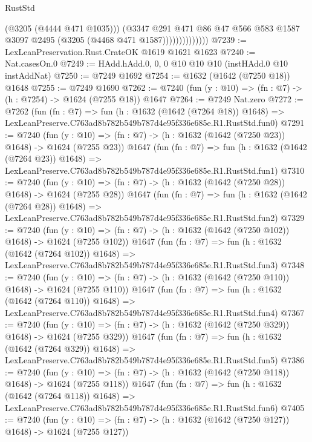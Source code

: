 \begin{lexlean}{RustStd}
\begin{coremodule}
                            (@3205 (@4444 @471 @1035)))
                          (@3347
                            @291
                            @471
                            @86
                            @47
                            @566
                            @583
                            @1587
                            @3097
                            @2495
                            (@3205 (@4468 @471 @1587))))))))))))))
@7239 := LexLeanPreservation.Rust.CrateOK @1619 @1621 @1623
@7240 := Nat.casesOn.{0}
@7249 := HAdd.hAdd.{0, 0, 0} @10 @10 @10 (instHAdd.{0} @10 instAddNat)
@7250 := @7249 @1692
@7254 := @1632 (@1642 (@7250 @18)) @1648
@7255 := @7249 @1690
@7262 := @7240 (fun (y : @10) => (fn : @7) -> (h : @7254) -> @1624 (@7255 @18)) @1647
@7264 := @7249 Nat.zero
@7272 := @7262
    (fun (fn : @7) =>
    fun (h : @1632 (@1642 (@7264 @18)) @1648) =>
    LexLeanPreserve.C763ad8b782b549b787d4e95f336e685e.R1.RustStd.fun0)
@7291 := @7240
    (fun (y : @10) => (fn : @7) -> (h : @1632 (@1642 (@7250 @23)) @1648) -> @1624 (@7255 @23))
    @1647
    (fun (fn : @7) =>
    fun (h : @1632 (@1642 (@7264 @23)) @1648) =>
    LexLeanPreserve.C763ad8b782b549b787d4e95f336e685e.R1.RustStd.fun1)
@7310 := @7240
    (fun (y : @10) => (fn : @7) -> (h : @1632 (@1642 (@7250 @28)) @1648) -> @1624 (@7255 @28))
    @1647
    (fun (fn : @7) =>
    fun (h : @1632 (@1642 (@7264 @28)) @1648) =>
    LexLeanPreserve.C763ad8b782b549b787d4e95f336e685e.R1.RustStd.fun2)
@7329 := @7240
    (fun (y : @10) => (fn : @7) -> (h : @1632 (@1642 (@7250 @102)) @1648) -> @1624 (@7255 @102))
    @1647
    (fun (fn : @7) =>
    fun (h : @1632 (@1642 (@7264 @102)) @1648) =>
    LexLeanPreserve.C763ad8b782b549b787d4e95f336e685e.R1.RustStd.fun3)
@7348 := @7240
    (fun (y : @10) => (fn : @7) -> (h : @1632 (@1642 (@7250 @110)) @1648) -> @1624 (@7255 @110))
    @1647
    (fun (fn : @7) =>
    fun (h : @1632 (@1642 (@7264 @110)) @1648) =>
    LexLeanPreserve.C763ad8b782b549b787d4e95f336e685e.R1.RustStd.fun4)
@7367 := @7240
    (fun (y : @10) => (fn : @7) -> (h : @1632 (@1642 (@7250 @329)) @1648) -> @1624 (@7255 @329))
    @1647
    (fun (fn : @7) =>
    fun (h : @1632 (@1642 (@7264 @329)) @1648) =>
    LexLeanPreserve.C763ad8b782b549b787d4e95f336e685e.R1.RustStd.fun5)
@7386 := @7240
    (fun (y : @10) => (fn : @7) -> (h : @1632 (@1642 (@7250 @118)) @1648) -> @1624 (@7255 @118))
    @1647
    (fun (fn : @7) =>
    fun (h : @1632 (@1642 (@7264 @118)) @1648) =>
    LexLeanPreserve.C763ad8b782b549b787d4e95f336e685e.R1.RustStd.fun6)
@7405 := @7240
    (fun (y : @10) => (fn : @7) -> (h : @1632 (@1642 (@7250 @127)) @1648) -> @1624 (@7255 @127))

\end{coremodule}
\end{lexlean}
